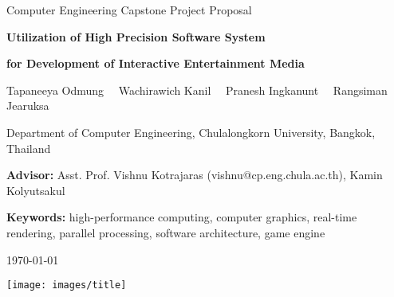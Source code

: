 \noindent
{\footnotesize
Computer Engineering Capstone Project Proposal
\par}

\vspace{0.3cm}

\noindent
{\Large\bfseries
Utilization of High Precision Software System
\par}

\noindent
{\Large\bfseries
for Development of Interactive Entertainment Media
\par}

\vspace{0.4cm}

\noindent
{\small
Tapaneeya Odmung   \, \textbar \,
Wachirawich Kanil  \, \textbar \,
Pranesh Ingkanunt  \, \textbar \,
Rangsiman Jearuksa
\par}

\vspace{0.3cm}

\noindent
{\scriptsize
Department of Computer Engineering, Chulalongkorn University, Bangkok, Thailand
\par}

\vspace{0.3cm}

\noindent
{\scriptsize
\textbf{Advisor:}
Asst. Prof. Vishnu Kotrajaras (vishnu@cp.eng.chula.ac.th),
Kamin Kolyutsakul %
\par}

\vspace{0.3cm}

\noindent
{\scriptsize
\textbf{Keywords:}
high-performance computing,
computer graphics,
real-time rendering,
parallel processing,
software architecture,
game engine
\par}

\vspace{0.3cm}

\noindent
{\normalsize \today \par}

\vspace{0.5cm}

\begin{center}
    \texttt{[image: images/title]}
\end{center}

